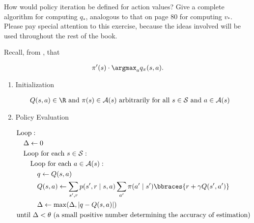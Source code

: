 
\begin{exercise}[Exercise 4.5]

How would policy iteration be defined for action values?
Give a complete algorithm for computing $q_\ast$, analogous to that on page 80 for computing $v_\ast$.
Please pay special attention to this exercise, because the ideas involved will be used throughout the rest of the book.

\end{exercise}


\begin{solution}

Recall, from \cite*[page 79]{SuttonRichardS2018Rl:a}, that

\begin{align*}
    \pi^\prime(s)
    \cdot
    \argmax_a q_\pi(s, a).
\end{align*}

\begin{tcolorbox}[title = Policy Iteration (using iterative policy evaluation) for estimating $\pi \approx \pi_\ast$]

    \begin{enumerate}[label = \arabic*.]

        \item Initialization
        
        \begin{align*}
            & Q(s, a) \in \R ~\text{and}~ \pi(s) \in \mathcal A(s) ~\text{arbitrarily for all}~ s \in \mathcal S ~\text{and}~ a \in \mathcal A(s)            
        \end{align*}

        \item Policy Evaluation
        
        \begin{align*}
            & \text{Loop}: \\
            & \quad \Delta \leftarrow 0 \\
            & \quad \text{Loop for each $s \in \mathcal S$}: \\
            & \quad \quad \text{Loop for each $a \in \mathcal A(s)$}: \\
            & \quad \quad \quad q \leftarrow Q(s, a) \\
            & \quad \quad \quad Q(s, a) \leftarrow \sum_{s^\prime, r} p(s^\prime, r \mid s, a) \sum_{a^\prime} \pi(a^\prime \mid s^\prime) \bbraces{r + \gamma Q(s^\prime, a^\prime)} \\
            & \quad \quad \quad \Delta \leftarrow \max(\Delta, |q - Q(s, a)|) \\
            & \text{until $\Delta < \theta$ (a small positive number determining the accuracy of estimation)}
        \end{align*}


\end{enumerate}
\end{tcolorbox}
\end{solution}
